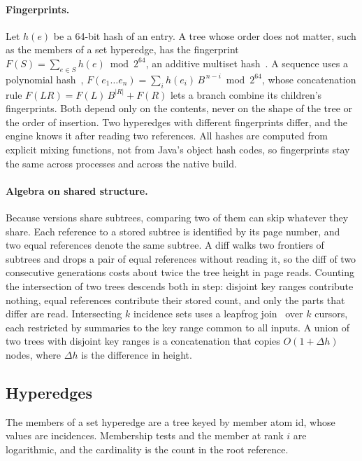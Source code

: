 \paragraph{Fingerprints.} Let $h(e)$ be a 64-bit hash of an entry. A tree whose order does not matter, such as the members of a set hyperedge, has the fingerprint $F(S)=\sum_{e\in S} h(e) \bmod 2^{64}$, an additive multiset hash~\cite{multiset-hash}. A sequence uses a polynomial hash~\cite{karp-rabin}, $F(e_1\ldots e_n)=\sum_i h(e_i)\,B^{\,n-i} \bmod 2^{64}$, whose concatenation rule $F(LR)=F(L)\,B^{|R|}+F(R)$ lets a branch combine its children's fingerprints. Both depend only on the contents, never on the shape of the tree or the order of insertion. Two hyperedges with different fingerprints differ, and the engine knows it after reading two references. All hashes are computed from explicit mixing functions, not from Java's object hash codes, so fingerprints stay the same across processes and across the native build.

\paragraph{Algebra on shared structure.} Because versions share subtrees, comparing two of them can skip whatever they share. Each reference to a stored subtree is identified by its page number, and two equal references denote the same subtree. A diff walks two frontiers of subtrees and drops a pair of equal references without reading it, so the diff of two consecutive generations costs about twice the tree height in page reads. Counting the intersection of two trees descends both in step: disjoint key ranges contribute nothing, equal references contribute their stored count, and only the parts that differ are read. Intersecting $k$ incidence sets uses a leapfrog join~\cite{leapfrog} over $k$ cursors, each restricted by summaries to the key range common to all inputs. A union of two trees with disjoint key ranges is a concatenation that copies $O(1+\Delta h)$ nodes, where $\Delta h$ is the difference in height.

\subsection{Hyperedges}
\label{sec:hyperedges}

The members of a set hyperedge are a tree keyed by member atom id, whose values are incidences. Membership tests and the member at rank $i$ are logarithmic, and the cardinality is the count in the root reference.

